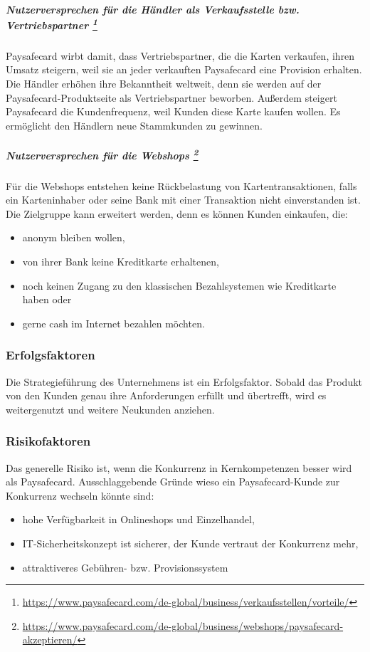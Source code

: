 \subparagraph[Nutzerversprechen für die Händler als Verkaufsstelle bzw. Vertriebspartner]{Nutzerversprechen für die Händler als Verkaufsstelle bzw. Vertriebspartner \footnote{\url{ https://www.paysafecard.com/de-global/business/verkaufsstellen/vorteile/}}}
Paysafecard wirbt damit, dass Vertriebspartner, die die Karten verkaufen, ihren Umsatz steigern, weil sie an jeder verkauften Paysafecard eine Provision erhalten. Die Händler erhöhen ihre Bekanntheit weltweit, denn sie werden auf der Paysafecard-Produktseite als Vertriebspartner beworben. Außerdem steigert Paysafecard die Kundenfrequenz, weil Kunden diese Karte kaufen wollen. Es ermöglicht den Händlern neue Stammkunden zu gewinnen.


\subparagraph[Nutzerversprechen für die Webshops]{Nutzerversprechen für die Webshops \footnote{\url{ https://www.paysafecard.com/de-global/business/webshops/paysafecard-akzeptieren/}}}
Für die Webshops entstehen keine Rückbelastung von Kartentransaktionen, falls ein Karteninhaber oder seine Bank mit einer Transaktion nicht einverstanden ist. Die Zielgruppe kann erweitert werden, denn es können Kunden einkaufen, die: 
\begin{itemize}
	\item anonym bleiben wollen,
    \item von ihrer Bank keine Kreditkarte erhaltenen,
    \item noch keinen Zugang zu den klassischen Bezahlsystemen wie Kreditkarte haben oder
    \item gerne cash im Internet bezahlen möchten.
\end{itemize}



\subsubsection{Erfolgsfaktoren}
Die Strategieführung des Unternehmens ist ein Erfolgsfaktor. Sobald das Produkt von den Kunden genau ihre Anforderungen erfüllt und übertrefft, wird es weitergenutzt und weitere Neukunden anziehen.



\subsubsection{Risikofaktoren}
Das generelle Risiko ist, wenn die Konkurrenz in Kernkompetenzen besser wird als Paysafecard. Ausschlaggebende Gründe wieso ein Paysafecard-Kunde zur Konkurrenz wechseln könnte sind:
\begin{itemize}
	\item hohe Verfügbarkeit in Onlineshops und Einzelhandel,
	\item IT-Sicherheitskonzept ist sicherer, der Kunde vertraut der Konkurrenz mehr,
	\item attraktiveres Gebühren- bzw. Provisionssystem
\end{itemize}

